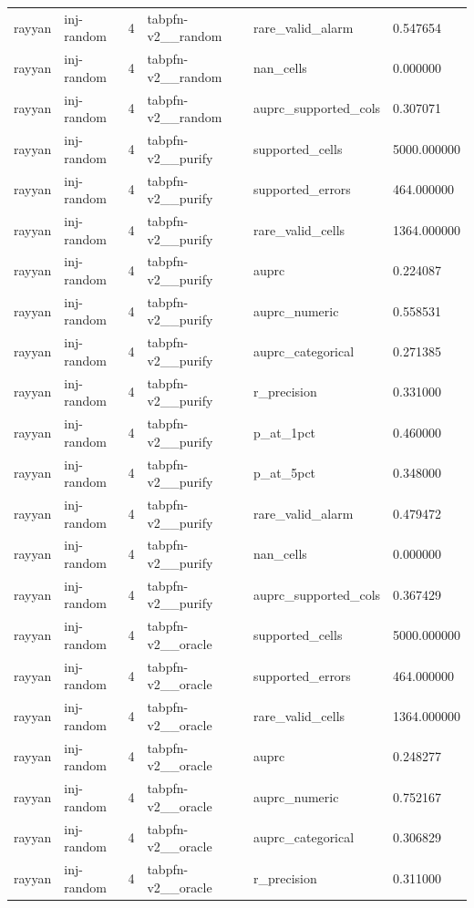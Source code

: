 \begin{tabular}{llllll}
rayyan & inj-random & 4 & tabpfn-v2\_\_random & rare\_valid\_alarm & 0.547654 \\
rayyan & inj-random & 4 & tabpfn-v2\_\_random & nan\_cells & 0.000000 \\
rayyan & inj-random & 4 & tabpfn-v2\_\_random & auprc\_supported\_cols & 0.307071 \\
rayyan & inj-random & 4 & tabpfn-v2\_\_purify & supported\_cells & 5000.000000 \\
rayyan & inj-random & 4 & tabpfn-v2\_\_purify & supported\_errors & 464.000000 \\
rayyan & inj-random & 4 & tabpfn-v2\_\_purify & rare\_valid\_cells & 1364.000000 \\
rayyan & inj-random & 4 & tabpfn-v2\_\_purify & auprc & 0.224087 \\
rayyan & inj-random & 4 & tabpfn-v2\_\_purify & auprc\_numeric & 0.558531 \\
rayyan & inj-random & 4 & tabpfn-v2\_\_purify & auprc\_categorical & 0.271385 \\
rayyan & inj-random & 4 & tabpfn-v2\_\_purify & r\_precision & 0.331000 \\
rayyan & inj-random & 4 & tabpfn-v2\_\_purify & p\_at\_1pct & 0.460000 \\
rayyan & inj-random & 4 & tabpfn-v2\_\_purify & p\_at\_5pct & 0.348000 \\
rayyan & inj-random & 4 & tabpfn-v2\_\_purify & rare\_valid\_alarm & 0.479472 \\
rayyan & inj-random & 4 & tabpfn-v2\_\_purify & nan\_cells & 0.000000 \\
rayyan & inj-random & 4 & tabpfn-v2\_\_purify & auprc\_supported\_cols & 0.367429 \\
rayyan & inj-random & 4 & tabpfn-v2\_\_oracle & supported\_cells & 5000.000000 \\
rayyan & inj-random & 4 & tabpfn-v2\_\_oracle & supported\_errors & 464.000000 \\
rayyan & inj-random & 4 & tabpfn-v2\_\_oracle & rare\_valid\_cells & 1364.000000 \\
rayyan & inj-random & 4 & tabpfn-v2\_\_oracle & auprc & 0.248277 \\
rayyan & inj-random & 4 & tabpfn-v2\_\_oracle & auprc\_numeric & 0.752167 \\
rayyan & inj-random & 4 & tabpfn-v2\_\_oracle & auprc\_categorical & 0.306829 \\
rayyan & inj-random & 4 & tabpfn-v2\_\_oracle & r\_precision & 0.311000 \\

\end{tabular}
